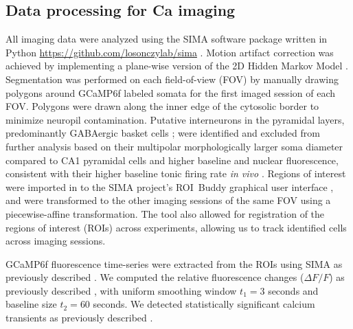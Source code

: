 \subsection{Data processing for Ca imaging}\label{sec:methods:processing}
All imaging data were analyzed using the SIMA software package written in Python \url{https://github.com/losonczylab/sima} \citep{Kaifosh2014}. Motion artifact correction was achieved by implementing a plane-wise version of the 2D Hidden Markov Model \citep{Dombeck2010}\citep{Kaifosh2013}\citep{Kaifosh2014}. Segmentation was performed on each field-of-view (FOV) by manually drawing polygons around GCaMP6f labeled somata for the first imaged session of each FOV.  Polygons were drawn along the inner edge of the cytosolic border to minimize neuropil contamination. Putative interneurons in the pyramidal layers, predominantly GABAergic basket cells \citep{Bezaire2013}\citep{Freund1996}\citep{Klausberger2008}; were identified and excluded from further analysis based on their multipolar morphologically larger soma diameter compared to CA1 pyramidal cells \citep{Ambros-Ingerson2005}\citep{Gulyas1999a}\citep{Papp2013} and higher baseline and nuclear fluorescence, consistent with their higher baseline tonic firing rate \emph{in vivo} \citep{Klausberger2003}\citep{Klausberger2003}\citep{Lapray2012}\citep{Varga2012}. Regions of interest were imported in to the SIMA project’s ROI~Buddy graphical user interface \citep{Kaifosh2014}, and were transformed to the other imaging sessions of the same FOV using a piecewise-affine transformation. The tool also allowed for registration of the regions of interest (ROIs) across experiments, allowing us to track identified cells across imaging sessions.

GCaMP6f fluorescence time-series were extracted from the ROIs using SIMA as previously described \citep{Kaifosh2014}. We computed the relative fluorescence changes ($\Delta F/F$) as previously described \citep{Jia2011}, with uniform smoothing window $t_1 = 3$ seconds and baseline size $t_2 = 60$ seconds. We detected statistically significant calcium transients as previously described \citep{Dombeck2007}\citep{Lovett-Barron2014}.

